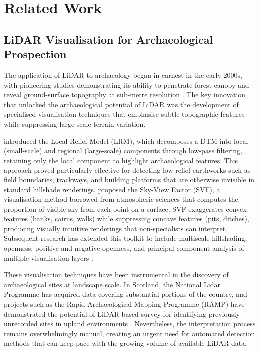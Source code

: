 \documentclass[12pt,a4paper]{article}
\begin{document}
\section{Related Work}

\subsection{LiDAR Visualisation for Archaeological Prospection}

The application of LiDAR to archaeology began in earnest in the early 2000s, with pioneering
studies demonstrating its ability to penetrate forest canopy and reveal ground-surface
topography at sub-metre resolution \citep{crutchley2010light}. The key innovation that
unlocked the archaeological potential of LiDAR was the development of specialised
visualisation techniques that emphasise subtle topographic features while suppressing
large-scale terrain variation.

\citet{hesse2010lidar} introduced the Local Relief Model (LRM), which decomposes a DTM into
local (small-scale) and regional (large-scale) components through low-pass filtering,
retaining only the local component to highlight archaeological features. This approach
proved particularly effective for detecting low-relief earthworks such as field boundaries,
trackways, and building platforms that are otherwise invisible in standard hillshade
renderings. \citet{kokalj2011application} proposed the Sky-View Factor (SVF), a
visualisation method borrowed from atmospheric sciences that computes the proportion of
visible sky from each point on a surface. SVF exaggerates convex features (banks, cairns,
walls) while suppressing concave features (pits, ditches), producing visually intuitive
renderings that non-specialists can interpret. Subsequent research has extended this
toolkit to include multiscale hillshading, openness, positive and negative openness, and
principal component analysis of multiple visualisation layers \citep{doneus2008archaeological,
devereux2008visualisation, mayoral2020automated}.

These visualisation techniques have been instrumental in the discovery of archaeological
sites at landscape scale. In Scotland, the National Lidar Programme has acquired data
covering substantial portions of the country, and projects such as the Rapid Archaeological
Mapping Programme (RAMP) have demonstrated the potential of LiDAR-based survey for
identifying previously unrecorded sites in upland environments \citep{banaszek2018only}.
Nevertheless, the interpretation process remains overwhelmingly manual, creating an urgent
need for automated detection methods that can keep pace with the growing volume of
available LiDAR data.
\end{document}
